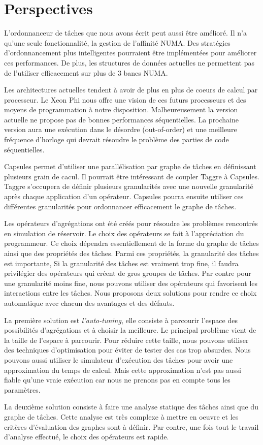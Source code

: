 \section{Perspectives}
L'ordonnanceur de tâches que nous avons écrit peut aussi être amélioré.
%
Il n'a qu'une seule fonctionnalité, la gestion de l'affinité NUMA.
%
Des stratégies d'ordonnancement plus intelligentes pourraient être implémentées pour améliorer ces performances.
%
De plus, les structures de données actuelles ne permettent pas de l'utiliser efficacement sur plus de 3 bancs NUMA.


Les architectures actuelles tendent à avoir de plus en plus de coeurs de calcul par processeur.
%
Le Xeon Phi nous offre une vision de ces futurs processeurs et des moyens de programmation à notre disposition.
%
Malheureusement la version actuelle ne propose pas de bonnes performances séquentielles.
%
La prochaine version aura une exécution dans le désordre (out-of-order) et une meilleure fréquence d'horloge qui devrait résoudre le problème des parties de code séquentielles.


Capsules permet d'utiliser une parallélisation par graphe de tâches en définissant plusieurs grain de cacul.
%
Il pourrait être intéressant de coupler Taggre à Capsules.
%
Taggre s'occupera de définir plusieurs granularités avec une nouvelle granularité après chaque application d'un opérateur.
%
Capsules pourra ensuite utiliser ces différentes granularités pour ordonnancer efficacement le graphe de tâches.


Les opérateurs d'agrégations ont été créés pour résoudre les problèmes rencontrés en simulation de réservoir.
%
Le choix des opérateurs se fait à l'appréciation du programmeur.
%
Ce choix dépendra essentiellement de la forme du graphe de tâches ainsi que des propriétés des tâches.
%
Parmi ces propriétés, la granularité des tâches est importante,
%
Si la granularité des tâches est vraiment trop fine, il faudra privilégier des opérateurs qui créent de gros groupes de tâches.
%
Par contre pour une granularité moins fine, nous pouvons utiliser des opérateurs qui favorisent les interactions entre les tâches.
%
Nous proposons deux solutions pour rendre ce choix automatique avec chacun des avantages et des défauts.


La première solution est {\em l'auto-tuning}, elle consiste à parcourir l'espace des possibilités d'agrégations et à choisir la meilleure.
%
Le principal problème vient de la taille de l'espace à parcourir.
%
Pour réduire cette taille, nous pouvons utiliser des techniques d'optimisation pour éviter de tester des cas trop absurdes.
%
Nous pouvons aussi utiliser le simulateur d'exécution des tâches pour avoir une approximation du temps de calcul.
%
Mais cette approximation n'est pas aussi fiable qu'une vraie exécution car nous ne prenons pas en compte tous les paramètres.


La deuxième solution consiste à faire une analyse statique des tâches ainsi que du graphe de tâches.
%
Cette analyse est très complexe à mettre en oeuvre et les critères d'évaluation des graphes sont à définir.
%
Par contre, une fois tout le travail d'analyse effectué, le choix des opérateurs est rapide.

